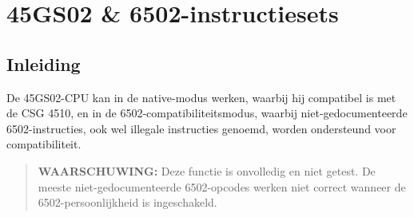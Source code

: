\begingroup
{}
\newcommand{\OPC}[4]{\makecell{\begin{tabular}{>{\raggedright\arraybackslash}p{0.4cm}>{\raggedleft\arraybackslash}p{0.8cm}}
\fontsize{8pt}{0pt}\selectfont #3 & \fontsize{8pt}{0pt}\selectfont {\em #4} \\[-3pt]\multicolumn{2}{c}{\fontsize{10pt}{0pt}\selectfont #1} \\[-3pt]\multicolumn{2}{c}{\fontsize{8pt}{0pt}\selectfont #2}
\end{tabular}}}
\newcommand{\OPCQ}[4]{\makecell{\begin{tabular}{>{\raggedright\arraybackslash}p{0.4cm}>{\raggedleft\arraybackslash}p{0.8cm}}
\fontsize{8pt}{0pt}\selectfont #3 & \fontsize{8pt}{0pt}\selectfont {\em #4} \\[-3pt]\multicolumn{2}{c}{\fontsize{10pt}{0pt}\selectfont #1} \\[-3pt]\multicolumn{2}{c}{\fontsize{8pt}{0pt}\selectfont #2} \\[-12pt]\fontsize{8pt}{0pt}\selectfont Q
\end{tabular}}}
\newcommand{\OPill}{\cellcolor[rgb]{1,.8,.8}}
\newcommand{\OPfar}{\cellcolor[rgb]{.8,1,.8}}
\newcommand{\OPquad}{\cellcolor[rgb]{.8,.8,1}}
\newcommand{\OPfarq}{\cellcolor[rgb]{.8,1,1}}
\newcommand{\binand}{$\mathit{AND}$}
\newcommand{\binor}{$\mathit{OR}$}
\newcommand{\binxor}{$\mathit{XOR}$}
\newcommand{\binnot}{$\mathit{NOT}$}
\newcommand{\binneg}{$\mathit{NEG}$}

\chapter{45GS02 \& 6502-instructiesets}

\section{Inleiding}

De 45GS02-CPU kan in de native-modus werken, waarbij hij compatibel is met de CSG 4510, en in de 6502-compatibiliteitsmodus, waarbij niet-gedocumenteerde 6502-instructies, ook wel illegale instructies genoemd, worden ondersteund voor compatibiliteit.

\begin{quote}
{\bf WAARSCHUWING:} Deze functie is onvolledig en niet getest. De meeste niet-gedocumenteerde 6502-opcodes werken niet correct wanneer de 6502-persoonlijkheid is ingeschakeld.
\end{quote}

